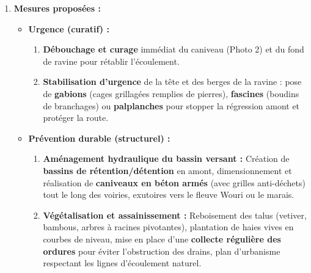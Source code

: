 \documentclass[11pt]{article}
\begin{document}
\begin{corrige}
\begin{enumerate}
    \item \textbf{Mesures proposées :}
    \begin{itemize}
        \item \textbf{Urgence (curatif) :}
        \begin{enumerate}
            \item \textbf{Débouchage et curage} immédiat du caniveau (Photo 2) et du fond de ravine pour rétablir l'écoulement.
            \item \textbf{Stabilisation d'urgence} de la tête et des berges de la ravine : pose de \textbf{gabions} (cages grillagées remplies de pierres), \textbf{fascines} (boudins de branchages) ou \textbf{palplanches} pour stopper la régression amont et protéger la route.
        \end{enumerate}
        \item \textbf{Prévention durable (structurel) :}
        \begin{enumerate}
            \item \textbf{Aménagement hydraulique du bassin versant :} Création de \textbf{bassins de rétention/détention} en amont, dimensionnement et réalisation de \textbf{caniveaux en béton armés} (avec grilles anti-déchets) tout le long des voiries, exutoires vers le fleuve Wouri ou le marais.
            \item \textbf{Végétalisation et assainissement :} Reboisement des talus (vetiver, bambous, arbres à racines pivotantes), plantation de haies vives en courbes de niveau, mise en place d'une \textbf{collecte régulière des ordures} pour éviter l'obstruction des drains, plan d'urbanisme respectant les lignes d'écoulement naturel.
        \end{enumerate}
    \end{itemize}
\end{enumerate}
\end{corrige}
\end{document}
